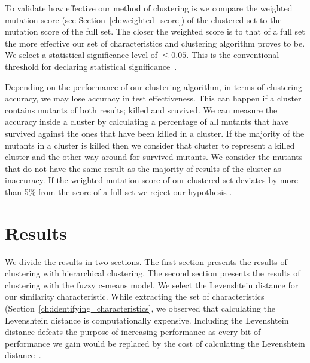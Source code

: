 \documentclass[conference,draftclsnofoot,onecolumn]{IEEEtran}
\begin{document}
To validate how effective our method of clustering is we compare the weighted mutation score (see Section~\ref{ch:weighted_score}) of the clustered set to the mutation score of the full set.
The closer the weighted score is to that of a full set the more effective our set of characteristics and clustering algorithm proves to be.
We select a statistical significance level of $\leq 0.05$.
This is the conventional threshold for declaring statistical significance~\cite{Kirk1996PracticalCome}.

Depending on the performance of our clustering algorithm, in terms of clustering accuracy, we may lose accuracy in test effectiveness. 
This can happen if a cluster contains mutants of both results; killed and sruvived. 
We can measure the accuracy inside a cluster by calculating a percentage of all mutants that have survived against the ones that have been killed in a cluster.
If the majority of the mutants in a cluster is killed then we consider that cluster to represent a killed cluster and the other way around for survived mutants.
We consider the mutants that do not have the same result as the majority of results of the cluster as inaccuracy.
If the weighted mutation score of our clustered set deviates by more than 5\% from the score of a full set we reject our hypothesis .

\section{Results}
\label{ch:results}
We divide the results in two sections. The first section presents the results of clustering with hierarchical clustering. The second section presents the results of clustering with the fuzzy c-means model.
We select the Levenshtein distance for our similarity characteristic\cite{thesis}.
While extracting the set of characteristics (Section~\ref{ch:identifying_characteristics}, we observed that calculating the Levenshtein distance is computationally expensive.
Including the Levenshtein distance defeats the purpose of increasing performance as every bit of performance we gain would be replaced by the cost of calculating the Levenshtein distance~\cite{thesis}.
\end{document}
